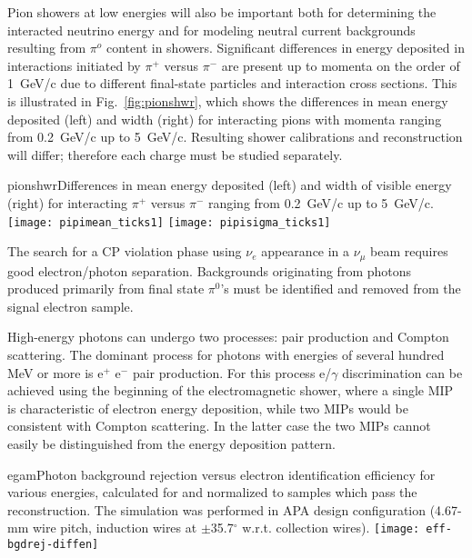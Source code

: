 \begin{description}
Pion showers at low energies will also be important both for determining the interacted neutrino energy and for modeling neutral current backgrounds resulting from $\pi^o$ content in showers. Significant
 differences in energy deposited in interactions initiated
by $\pi^+$ versus $\pi^-$  are present up to momenta on the order of 1~GeV/c due to different
final-state particles and interaction cross sections. This is illustrated in 
Fig.~\ref{fig:pionshwr}, which shows the differences in mean energy deposited (left) and width (right) 
for interacting pions with momenta ranging from 0.2~GeV/c up to 5~GeV/c.
Resulting shower calibrations and reconstruction will differ; therefore each charge must be 
studied separately.

\begin{cdrfigure}{pionshwr}{Differences in mean energy deposited (left) and width of visible energy (right) 
for interacting $\pi^+$ versus $\pi^-$ ranging from 0.2~GeV/c up to 5~GeV/c. }
\texttt{[image: pipimean\_ticks1]}
\texttt{[image: pipisigma\_ticks1]}
\end{cdrfigure}


\item [Characterization of electromagnetic showers]


\item [Study of $e/\gamma$ separation capabilities]

The search for a CP violation phase using $\nu_e$ appearance 
in a $\nu_\mu$ beam requires good electron/photon separation.
Backgrounds originating from photons produced primarily from 
final state $\pi^0$'s must be identified and removed from the signal
electron sample. 

High-energy photons can undergo two processes: pair production and Compton scattering. 
The dominant process for photons with energies of several hundred MeV or more is 
e$^+$ e$^-$ pair production.
For this process e/$\gamma$ discrimination
 can be achieved using the beginning of the electromagnetic shower, where 
a single MIP is characteristic of electron energy deposition, while two MIPs would be consistent 
with Compton scattering. %
In the latter case %
the two MIPs cannot easily be distinguished
from the energy deposition pattern.

\begin{cdrfigure}{egam}{Photon background rejection versus electron identification efficiency for various energies, calculated for and normalized to samples which pass the reconstruction. 
The simulation was performed in APA design configuration (4.67-mm wire pitch, induction wires at $\pm$35.7$^{\circ}$ w.r.t. collection wires).}
\texttt{[image: eff-bgdrej-diffen]}
\end{cdrfigure}



\end{description}
